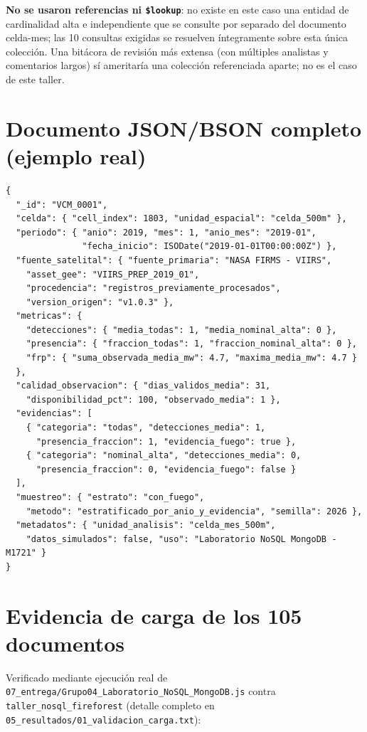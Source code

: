\documentclass[11pt]{article}
\begin{document}
\textbf{No se usaron referencias ni \lstinline!$lookup!}: no existe en este
caso una entidad de cardinalidad alta e independiente que se consulte por
separado del documento celda-mes; las 10 consultas exigidas se resuelven
íntegramente sobre esta única colección. Una bitácora de revisión más
extensa (con múltiples analistas y comentarios largos) sí ameritaría una
colección referenciada aparte; no es el caso de este taller.

\section{Documento JSON/BSON completo (ejemplo real)}

\begin{lstlisting}
{
  "_id": "VCM_0001",
  "celda": { "cell_index": 1803, "unidad_espacial": "celda_500m" },
  "periodo": { "anio": 2019, "mes": 1, "anio_mes": "2019-01",
               "fecha_inicio": ISODate("2019-01-01T00:00:00Z") },
  "fuente_satelital": { "fuente_primaria": "NASA FIRMS - VIIRS",
    "asset_gee": "VIIRS_PREP_2019_01",
    "procedencia": "registros_previamente_procesados",
    "version_origen": "v1.0.3" },
  "metricas": {
    "detecciones": { "media_todas": 1, "media_nominal_alta": 0 },
    "presencia": { "fraccion_todas": 1, "fraccion_nominal_alta": 0 },
    "frp": { "suma_observada_media_mw": 4.7, "maxima_media_mw": 4.7 }
  },
  "calidad_observacion": { "dias_validos_media": 31,
    "disponibilidad_pct": 100, "observado_media": 1 },
  "evidencias": [
    { "categoria": "todas", "detecciones_media": 1,
      "presencia_fraccion": 1, "evidencia_fuego": true },
    { "categoria": "nominal_alta", "detecciones_media": 0,
      "presencia_fraccion": 0, "evidencia_fuego": false }
  ],
  "muestreo": { "estrato": "con_fuego",
    "metodo": "estratificado_por_anio_y_evidencia", "semilla": 2026 },
  "metadatos": { "unidad_analisis": "celda_mes_500m",
    "datos_simulados": false, "uso": "Laboratorio NoSQL MongoDB - M1721" }
}
\end{lstlisting}

\section{Evidencia de carga de los 105 documentos}

Verificado mediante ejecución real de
\texttt{07\_entrega/Grupo04\_Laboratorio\_NoSQL\_MongoDB.js} contra
\texttt{taller\_nosql\_fireforest} (detalle completo en
\texttt{05\_resultados/01\_validacion\_carga.txt}):
\end{document}
